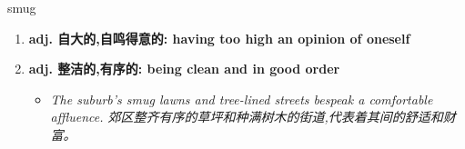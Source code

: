 
\begin{frame}
{\huge smug}
\begin{center}
\begin{enumerate}\Large
  \item \textbf{adj. 自大的,自鸣得意的: having too high an opinion of oneself}
  \item \textbf{adj. 整洁的,有序的: being clean and in good order}
  \begin{itemize}
    \item \em{\Large{The suburb's smug lawns and tree-lined streets bespeak a comfortable affluence. 郊区整齐有序的草坪和种满树木的街道,代表着其间的舒适和财富。}}
  \end{itemize}
\end{enumerate}
\end{center}
\end{frame}
